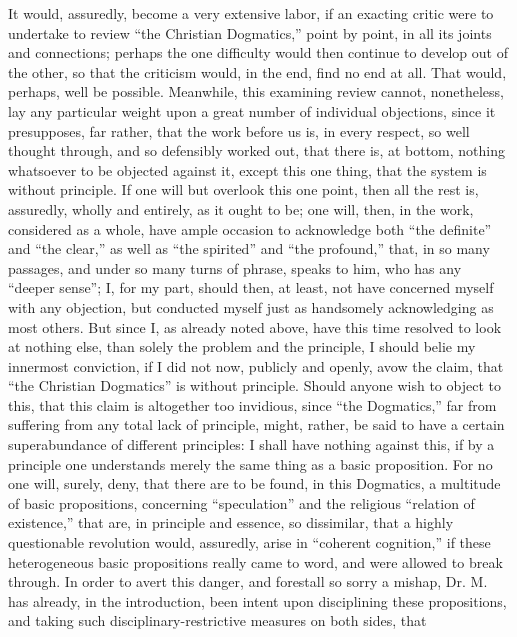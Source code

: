 \documentclass[12pt]{book}
\begin{document}
It would, assuredly, become a very extensive labor, if an exacting critic were to undertake to review ``the Christian Dogmatics,'' point by point, in all its joints and connections; perhaps the one difficulty would then continue to develop out of the other, so that the criticism would, in the end, find no end at all. That would, perhaps, well be possible. Meanwhile, this examining review cannot, nonetheless, lay any particular weight upon a great number of individual objections, since it presupposes, far rather, that the work before us is, in every respect, so well thought through, and so defensibly worked out, that there is, at bottom, nothing whatsoever to be objected against it, except this one thing, that the system is without principle. If one will but overlook this one point, then all the rest is, assuredly, wholly and entirely, as it ought to be; one will, then, in the work, considered as a whole, have ample occasion to acknowledge both ``the definite'' and ``the clear,'' as well as ``the
spirited'' and ``the profound,'' that, in so many passages, and under so many turns of phrase, speaks to him, who has any ``deeper sense''; I, for my part, should then, at least, not have concerned myself with any objection, but conducted myself just as handsomely acknowledging as most others. But since I, as already noted above, have this time resolved to look at nothing else, than solely the problem and the principle, I should belie my innermost conviction, if I did not now, publicly and openly, avow the claim, that ``the Christian Dogmatics'' is without principle. Should anyone wish to object to this, that this claim is altogether too invidious, since ``the Dogmatics,'' far from suffering from any total lack of principle, might, rather, be said to have a certain superabundance of different principles: I shall have nothing against this, if by a principle one understands merely the same thing as a basic proposition. For no one will, surely, deny, that there are to be found, in this Dogmatics, a multitude of basic propositions, concerning ``speculation'' and the religious ``relation of existence,'' that are, in principle and essence, so dissimilar, that a highly questionable revolution would, assuredly, arise in ``coherent cognition,'' if these heterogeneous basic propositions really came to word, and were allowed to break through. In order to avert this danger, and forestall so sorry a mishap, Dr. M. has already, in the introduction, been intent upon disciplining these propositions, and taking such disciplinary-restrictive measures on both sides, that
\end{document}
